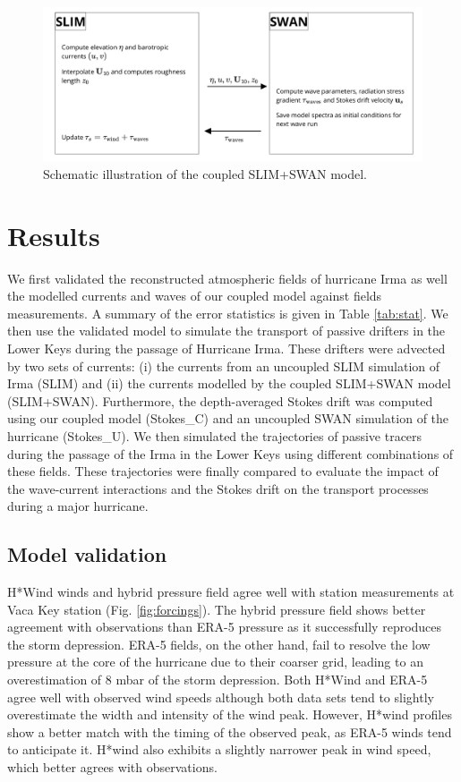 \documentclass[preprint,12pt,authoryear]{elsarticle}
\begin{document}
\begin{figure}
    \centering
    \includegraphics[width=.99\textwidth]{fig/coupling_v2.png}
    \caption{Schematic illustration of the coupled SLIM+SWAN model.}
    \label{fig:coupling}
\end{figure}
 

\section{Results}

We first validated the reconstructed atmospheric fields of hurricane Irma as well the modelled currents and waves of our coupled model against fields measurements. A summary of the error statistics is given in Table \ref{tab:stat}. We then use the validated model to simulate the transport of passive drifters in the Lower Keys during the passage of Hurricane Irma. These drifters were advected by two sets of currents: (i) the currents from an uncoupled SLIM simulation of Irma (SLIM) and (ii) the currents modelled by the coupled SLIM+SWAN model (SLIM+SWAN). Furthermore, the depth-averaged Stokes drift was computed using our coupled model (Stokes\_C) and an uncoupled SWAN simulation of the hurricane (Stokes\_U). We then simulated the trajectories of passive tracers during the passage of the Irma in the Lower Keys using different combinations of these fields. These trajectories were finally compared to evaluate the impact of the wave-current interactions and the Stokes drift on the transport processes during a major hurricane.

\subsection{Model validation}

H*Wind winds and hybrid pressure field agree well with station measurements at Vaca Key station (Fig. \ref{fig:forcings}). The hybrid pressure field shows better agreement with observations than ERA-5 pressure as it successfully reproduces the storm depression. ERA-5 fields, on the other hand, fail to resolve the low pressure at the core of the hurricane due to their coarser grid, leading to an overestimation of 8 mbar of the storm depression. Both H*Wind and ERA-5 agree well with observed wind speeds although both data sets tend to slightly overestimate the width and intensity of the wind peak. However, H*wind profiles show a better match with the timing of the observed peak, as ERA-5 winds tend to anticipate it. H*wind also exhibits a slightly narrower peak in wind speed, which better agrees with observations.
\end{document}
